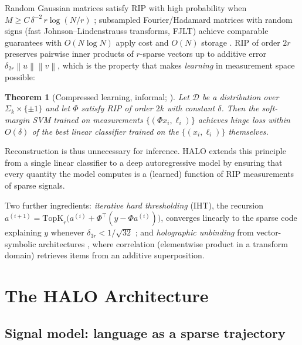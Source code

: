\documentclass[11pt]{article}
\newtheorem{theorem}{Theorem}
\newcommand{\norm}[1]{\left\lVert #1 \right\rVert}
\newcommand{\topk}{\mathrm{TopK}}
\begin{document}
Random Gaussian matrices satisfy RIP with high probability when $M \ge C\,\delta^{-2}\, r \log(N/r)$ \citep{baraniuk2008simple}; subsampled Fourier/Hadamard matrices with random signs (fast Johnson--Lindenstrauss transforms, FJLT) achieve comparable guarantees with $O(N \log N)$ apply cost and $O(N)$ storage \citep{ailon2009fast,krahmer2011new}. RIP of order $2r$ preserves pairwise inner products of $r$-sparse vectors up to additive error $\delta_{2r}\norm{u}\norm{v}$, which is the property that makes \emph{learning} in measurement space possible:

\begin{theorem}[Compressed learning, informal; \citealp{calderbank2009compressed}]
\label{thm:cl}
Let $\mathcal{D}$ be a distribution over $\Sigma_k \times \{\pm 1\}$ and let $\Phi$ satisfy RIP of order $2k$ with constant $\delta$. Then the soft-margin SVM trained on measurements $\{(\Phi x_i, \ell_i)\}$ achieves hinge loss within $O(\delta)$ of the best linear classifier trained on the $\{(x_i,\ell_i)\}$ themselves.
\end{theorem}

Reconstruction is thus unnecessary for inference. HALO extends this principle from a single linear classifier to a deep autoregressive model by ensuring that every quantity the model computes is a (learned) function of RIP measurements of sparse signals.

Two further ingredients: \emph{iterative hard thresholding} (IHT), the recursion $a^{(i+1)} = \topk_r\!\big(a^{(i)} + \Phi^\top(y - \Phi a^{(i)})\big)$, converges linearly to the sparse code explaining $y$ whenever $\delta_{3r} < 1/\sqrt{32}$ \citep{blumensath2009iterative}; and \emph{holographic unbinding} from vector-symbolic architectures \citep{plate1995holographic,kanerva2009hyperdimensional}, where correlation (elementwise product in a transform domain) retrieves items from an additive superposition.

\section{The HALO Architecture}
\label{sec:arch}

\subsection{Signal model: language as a sparse trajectory}
\label{sec:signal}
\end{document}
